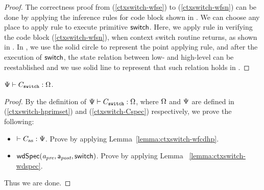 \begin{proof}
    The correctness proof from
    (\ref{ctxswitch-wfse}) to (\ref{ctxswitch-wfsn})
    can be done by applying the inference rules for
    code block shown in
    \Fig{\ref{fig:Selected Inference Rules for Refinement Verification}}.
    We can choose any place to apply
     rule to execute primitive $\mathsf{switch}$.
    Here, we apply  rule
    in verifying the code block
    \SwitchNewTask{} (\ref{ctxswitch-wfsn}),
    when context switch routine returns,
    as shown in \Fig{\ref{fig:refinement reasoning}}.
    In \Fig{\ref{fig:refinement reasoning}}, we use the
    solid circle to represent the point applying  rule,
    and after the execution of $\mathsf{switch}$, the
    state relation between low- and high-level can
    be reestablished and we use solid line to represent
    that such relation holds in \Fig{\ref{fig:refinement reasoning}}.
\end{proof}

\begin{theorem}
    \em
    ${\Psi} \vdash {C_{\texttt{switch}}} : {\Omega}$.
\end{theorem}
\begin{proof}
    By the definition of
    ${\Psi} \vdash {C_{\texttt{switch}}} : {\Omega}$,
    where $\Omega$ and $\Psi{}$ are defined in
    (\ref{ctxswitch-hprimset}) and (\ref{ctxswitch-Cspec})
    respectively, we prove the following:
    \begin{itemize}
        \item $\vdash {C_{\text{as}}} : {\Psi{}}$.
            Prove by applying Lemma~\ref{lemma:ctxswitch-wfcdhp}.
        \item $\textsf{wdSpec}({\textit{a}_\textit{pre}}, {\mathsf{a}_{\textit{post}}}, {\mathsf{switch}})$.
            Prove by applying Lemma ~\ref{lemma:ctxswitch-wdspec}.
    \end{itemize}
    Thus we are done.
\end{proof}

